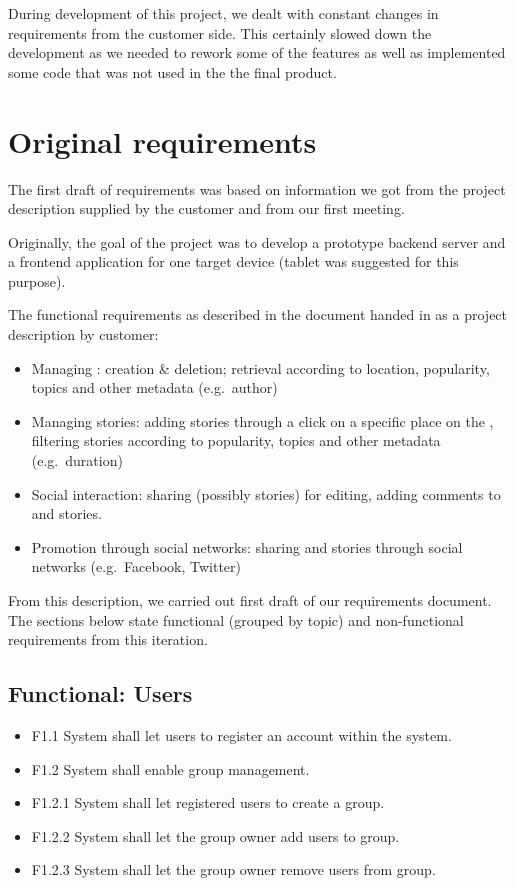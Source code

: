 \documentclass[11pt]{book}
\begin{document}
During development of this project, we dealt with constant changes in
requirements from the customer side. This certainly slowed down the
development as we needed to rework some of the features as well as
implemented some code that was not used in the the final product.

\section{Original requirements}\label{original-requirements}

The first draft of requirements was based on information we got from the
project description supplied by the customer and from our first meeting.

Originally, the goal of the project was to develop a prototype backend
server and a frontend application for one target device (tablet was
suggested for this purpose).

The functional requirements as described in the document handed in as a
project description by customer:

\begin{itemize}
  \item Managing \wallentityp: creation \& deletion; retrieval according to
  location, popularity, topics and other metadata (e.g.~author)
  \item Managing stories: adding stories through a click on a specific place
  on the \wallentitys, filtering stories according to popularity, topics and
  other metadata (e.g.~duration)
  \item Social interaction: sharing \wallentityp (possibly stories) for editing,
  adding comments to \wallentityp and stories.
  \item Promotion through social networks: sharing \wallentityp and stories through
  social networks (e.g.~Facebook, Twitter)
\end{itemize}

From this description, we carried out first draft of our requirements
document. The sections below state functional (grouped by topic) and
non-functional requirements from this iteration.

\subsection{Functional: Users}\label{functional-users}

\begin{itemize}
  \item F1.1 System shall let users to register an account within the system.
  \item F1.2 System shall enable group management.
  \item F1.2.1 System shall let registered users to create a group.
  \item F1.2.2 System shall let the group owner add users to group.
  \item F1.2.3 System shall let the group owner remove users from group.
\end{itemize}
\end{document}
